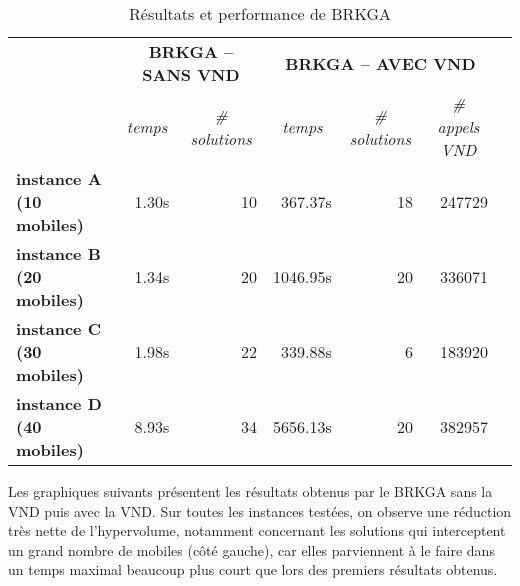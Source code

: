             \begin{table}[H]
                \centering
                \begin{tabular}{r|r|r|r|r|r|l}
                \cline{2-6}
                \multicolumn{1}{l|}{\multirow{2}{*}{}}                 & \multicolumn{2}{c|}{\textbf{BRKGA -- SANS VND}}                                  & \multicolumn{3}{c|}{\textbf{BRKGA -- AVEC VND}}                                                                                &  \\ \cline{2-6}
                \multicolumn{1}{l|}{}                                  & \multicolumn{1}{c|}{\textit{temps}} & \multicolumn{1}{c|}{\textit{\# solutions}} & \multicolumn{1}{c|}{\textit{temps}} & \multicolumn{1}{c|}{\textit{\# solutions}} & \multicolumn{1}{c|}{\textit{\# appels VND}} &  \\ \cline{1-6}
                \multicolumn{1}{|l|}{\textbf{instance A (10 mobiles)}} & 1.30s                               & 10                                         & 367.37s                             & 18                                         & 247729                                      &  \\ \cline{1-6}
                \multicolumn{1}{|l|}{\textbf{instance B (20 mobiles)}} & 1.34s                               & 20                                         & 1046.95s                            & 20                                         & 336071                                      &  \\ \cline{1-6}
                \multicolumn{1}{|l|}{\textbf{instance C (30 mobiles)}} & 1.98s                               & 22                                         & 339.88s                             & 6                                          & 183920                                      &  \\ \cline{1-6}
                \multicolumn{1}{|l|}{\textbf{instance D (40 mobiles)}} & 8.93s                               & 34                                         & 5656.13s                            & 20                                         & 382957                                      &  \\ \cline{1-6}
                \end{tabular}
                \caption{Résultats et performance de BRKGA}
                \label{tab:brkga}
            \end{table}
            
            Les graphiques suivants présentent les résultats obtenus par le BRKGA sans la VND puis avec la VND. Sur toutes les instances testées, on observe une réduction très nette de l'hypervolume, notamment concernant les solutions qui interceptent un grand nombre de mobiles (côté gauche), car elles parviennent à le faire dans un temps maximal beaucoup plus court que lors des premiers résultats obtenus.
            
